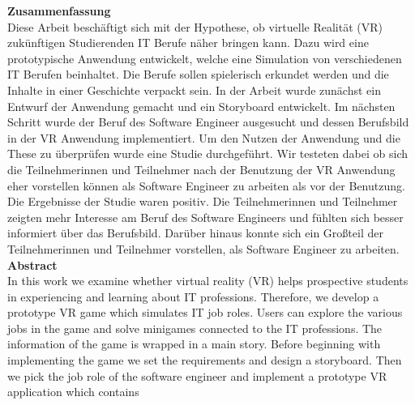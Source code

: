 \begin{titlepage}
\newpage
\textbf{Zusammenfassung}\\
Diese Arbeit beschäftigt sich mit der Hypothese, ob virtuelle Realität (VR) zukünftigen Studierenden IT Berufe näher bringen kann. Dazu wird eine prototypische Anwendung entwickelt, welche eine Simulation von verschiedenen IT Berufen beinhaltet. Die Berufe sollen spielerisch erkundet werden und die Inhalte in einer Geschichte verpackt sein. In der Arbeit wurde zunächst ein Entwurf der Anwendung gemacht und ein Storyboard entwickelt. Im nächsten Schritt wurde der Beruf des Software Engineer ausgesucht und dessen Berufsbild in der VR Anwendung implementiert. Um den Nutzen der Anwendung und die These zu überprüfen wurde eine Studie durchgeführt. Wir testeten dabei ob sich die Teilnehmerinnen und Teilnehmer nach der Benutzung der VR Anwendung eher vorstellen können als Software Engineer zu arbeiten als vor der Benutzung. Die Ergebnisse der Studie waren positiv. Die Teilnehmerinnen und Teilnehmer zeigten mehr Interesse am Beruf des Software Engineers und fühlten sich besser informiert über das Berufsbild. Darüber hinaus konnte sich ein Großteil der Teilnehmerinnen und Teilnehmer vorstellen, als Software Engineer zu
\vspace*{2cm}
 arbeiten. \\
 \vspace*{0.1cm}
\textbf{Abstract}\\
In this work we examine whether virtual reality (VR) helps prospective students in experiencing and learning about IT professions. Therefore, we develop a prototype VR game which simulates IT job roles. Users can explore the various jobs in the game and solve minigames connected to the IT professions. The information of the game is wrapped in a main story. Before beginning with implementing the game we set the requirements and design a storyboard. Then we pick the job role of the software engineer and implement a prototype VR application which contains 
\end{titlepage}
